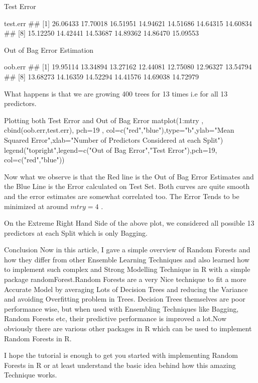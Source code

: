 Test Error

test.err
##  [1] 26.06433 17.70018 16.51951 14.94621 14.51686 14.64315 14.60834
##  [8] 15.12250 14.42441 14.53687 14.89362 14.86470 15.09553

Out of Bag Error Estimation

oob.err
##  [1] 19.95114 13.34894 13.27162 12.44081 12.75080 12.96327 13.54794
##  [8] 13.68273 14.16359 14.52294 14.41576 14.69038 14.72979

What happens is that we are growing 400 trees for 13 times i.e for all 13 predictors.

Plotting both Test Error and Out of Bag Error
matplot(1:mtry , cbind(oob.err,test.err), pch=19 , col=c("red","blue"),type="b",ylab="Mean Squared Error",xlab="Number of Predictors Considered at each Split")
legend("topright",legend=c("Out of Bag Error","Test Error"),pch=19, col=c("red","blue"))


Now what we observe is that the Red line is the Out of Bag Error Estimates and the Blue Line is the Error calculated on Test Set. Both curves are quite smooth and the error estimates are somewhat correlated too. The Error Tends to be minimized at around \( mtry = 4 \) .

On the Extreme Right Hand Side of the above plot, we considered all possible 13 predictors at each Split which is only Bagging.

Conclusion
Now in this article, I gave a simple overview of Random Forests and how they differ from other Ensemble Learning Techniques and also learned how to implement such complex and Strong Modelling Technique in R with a simple package randomForest.Random Forests are a very Nice technique to fit a more Accurate Model by averaging Lots of Decision Trees and reducing the Variance and avoiding Overfitting problem in Trees. Decision Trees themselves are poor performance wise, but when used with Ensembling Techniques like Bagging, Random Forests etc, their predictive performance is improved a lot.Now obviously there are various other packages in R which can be used to implement Random Forests in R.

I hope the tutorial is enough to get you started with implementing Random Forests in R or at least understand the basic idea behind how this amazing Technique works.
